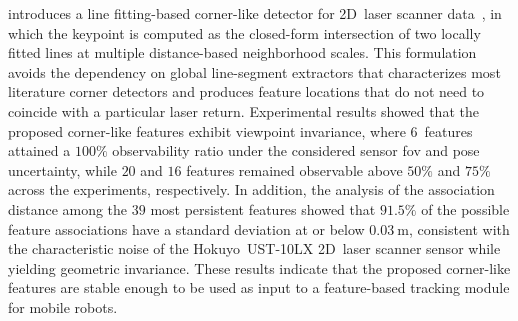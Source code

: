  introduces a line fitting-based corner-like
detector for 2D~laser scanner data~\cite{sousa:icara:2024}, in which
the keypoint is computed as the closed-form intersection of two
locally fitted lines at multiple distance-based neighborhood scales. This
formulation avoids the dependency on global line-segment extractors
that characterizes most literature corner detectors and produces
feature locations that do not need to coincide with a particular
laser return. Experimental results showed that the proposed
corner-like features exhibit viewpoint invariance, where
$6$~features attained a $100\%$ observability ratio under the
considered sensor \gls{fov} and pose uncertainty, while $20$ and $16$ features
remained observable above $50\%$ and $75\%$ across the experiments, respectively.
In addition, the analysis of the association distance among the $39$
most persistent features showed that $91.5\%$ of the possible
feature associations have a standard deviation at or below
$\SI{0.03}{\metre}$, consistent with the characteristic noise of the
Hokuyo~UST-10LX 2D~laser scanner sensor while yielding geometric invariance.
These results indicate that the proposed corner-like features are stable enough
to be used as input to a feature-based tracking module for mobile robots.

